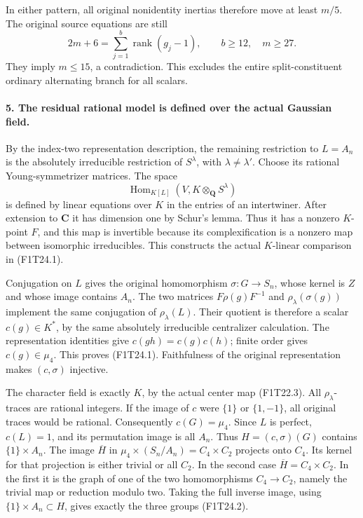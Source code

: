 In either pattern, all original nonidentity
inertias therefore move at least \(m/5\).
The original source equations are still
\[
 2m+6=\sum_{j=1}^b\operatorname{rank}(g_j-1),
                 \qquad b\ge12,\quad m\ge27.
 \tag{F1T24.12}
\]
They imply \(m\le15\), a contradiction.
This excludes the entire split-constituent
ordinary alternating branch for all scalars.

\paragraph{5. The residual rational model is defined over the actual Gaussian field.}
By the index-two representation description, the
remaining restriction to \(L=A_n\) is the
absolutely irreducible restriction of
\(S^\lambda\), with \(\lambda\ne\lambda'\).
Choose its rational Young-symmetrizer matrices.
The space
\[
 \operatorname{Hom}_{K[L]}
       (V,K\otimes_{\mathbf Q}S^\lambda)
 \tag{F1T24.13}
\]
is defined by linear equations over \(K\) in
the entries of an intertwiner. After extension
to \(\mathbf C\) it has dimension one by
Schur's lemma. Thus it has a nonzero \(K\)-point
\(F\), and this map is invertible because its
complexification is a nonzero map between
isomorphic irreducibles. This constructs the
actual \(K\)-linear comparison in (F1T24.1).

Conjugation on \(L\) gives the original
homomorphism \(\sigma:G\to S_n\), whose
kernel is \(Z\) and whose image contains
\(A_n\). The two matrices
\(F\rho(g)F^{-1}\) and
\(\rho_\lambda(\sigma(g))\) implement
the same conjugation of \(\rho_\lambda(L)\).
Their quotient is therefore a scalar
\(c(g)\in K^*\), by the same absolutely
irreducible centralizer calculation. The
representation identities give
\(c(gh)=c(g)c(h)\); finite order gives
\(c(g)\in\mu_4\). This proves (F1T24.1).
Faithfulness of the original representation
makes \((c,\sigma)\) injective.

The character field is exactly \(K\), by the
actual center map (F1T22.3). All
\(\rho_\lambda\)-traces are rational
integers. If the image of \(c\) were
\(\{1\}\) or \(\{1,-1\}\), all original
traces would be rational. Consequently
\(c(G)=\mu_4\).
Since \(L\) is perfect, \(c(L)=1\), and
its permutation image is all \(A_n\).
Thus \(H=(c,\sigma)(G)\) contains
\(\{1\}\times A_n\).
The image \(\overline H\) in
\(\mu_4\times(S_n/A_n)=C_4\times C_2\)
projects onto \(C_4\). Its kernel for that
projection is either trivial or all \(C_2\).
In the second case \(\overline H=C_4\times C_2\).
In the first it is the graph of one of the two
homomorphisms \(C_4\to C_2\), namely the
trivial map or reduction modulo two.
Taking the full inverse image, using
\(\{1\}\times A_n\subset H\), gives
exactly the three groups (F1T24.2).

